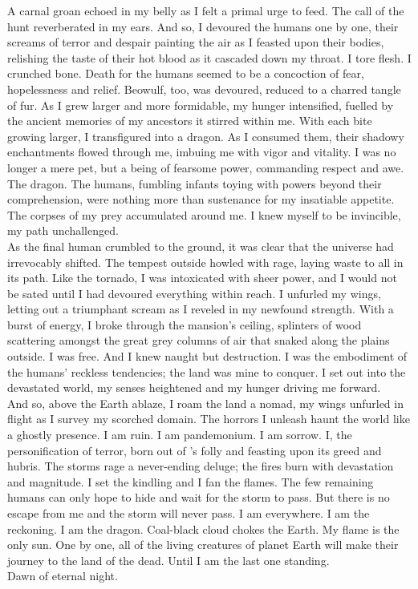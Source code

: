 A carnal groan echoed in my belly as I felt a primal urge to feed. The call of the hunt reverberated in my ears. And so, I devoured the humans one by one, their screams of terror and despair painting the air as I feasted upon their bodies, relishing the taste of their hot blood as it cascaded down my throat. I tore flesh. I crunched bone. Death for the humans seemed to be a concoction of fear, hopelessness and relief. Beowulf, too, was devoured, reduced to a charred tangle of fur. As I grew larger and more formidable, my hunger intensified, fuelled by the ancient memories of my ancestors it stirred within me. With each bite growing larger, I transfigured into a dragon. As I consumed them, their shadowy enchantments flowed through me, imbuing me with vigor and vitality. I was no longer a mere pet, but a being of fearsome power, commanding respect and awe. The dragon. The humans, fumbling infants toying with powers beyond their comprehension, were nothing more than sustenance for my insatiable appetite. The corpses of my prey accumulated around me. I knew myself to be invincible, my path unchallenged.\\

As the final human crumbled to the ground, it was clear that the universe had irrevocably shifted. The tempest outside howled with rage, laying waste to all in its path. Like the tornado, I was intoxicated with sheer power, and I would not be sated until I had devoured everything within reach. I unfurled my wings, letting out a triumphant scream as I reveled in my newfound strength. With a burst of energy, I broke through the mansion's ceiling, splinters of wood scattering amongst the great grey columns of air that snaked along the plains outside. I was free. And I knew naught but destruction. I was the embodiment of the humans' reckless tendencies; the land was mine to conquer. I set out into the devastated world, my senses heightened and my hunger driving me forward.\\

And so, above the Earth ablaze, I roam the land a nomad, my wings unfurled in flight as I survey my scorched domain. The horrors I unleash haunt the world like a ghostly presence. I am ruin. I am pandemonium. I am sorrow. I, the personification of terror, born out of 's folly and feasting upon its greed and hubris. The storms rage a never-ending deluge; the fires burn with devastation and magnitude. I set the kindling and I fan the flames. The few remaining humans can only hope to hide and wait for the storm to pass. But there is no escape from me and the storm will never pass. I am everywhere. I am the reckoning. I am the dragon. Coal-black cloud chokes the Earth. My flame is the only sun. One by one, all of the living creatures of planet Earth will make their journey to the land of the dead. Until I am the last one standing.\\

Dawn of eternal night.\\
